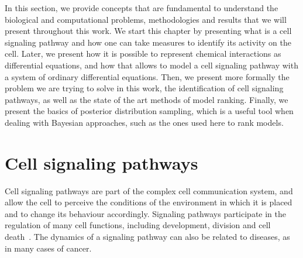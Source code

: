 
In this section, we provide concepts that are fundamental to 
understand the biological and computational problems, methodologies and
results that we will present throughout this work. We start this chapter 
by presenting what is a cell signaling pathway and how one can take 
measures to identify its activity on the cell. Later, we present how 
it is possible to represent chemical interactions as differential 
equations, and how that allows to model a cell signaling pathway
with a system of ordinary differential equations. Then, we present 
more formally the problem we are trying to solve in this work, the
identification of cell signaling pathways, as well as the state of the
art methods of model ranking. Finally, we present the basics of 
posterior distribution sampling, which is a useful tool when dealing 
with Bayesian approaches, such as the ones used here to rank models.

\section{Cell signaling pathways}
Cell signaling pathways are part of the complex cell communication 
system, and allow the cell to perceive the conditions of the 
environment in which it is placed and to change its behaviour
accordingly. Signaling pathways participate in the regulation of many
cell functions, including development, division and cell
death~\cite{Hancock2017}. The dynamics of a signaling pathway can also
be related to diseases, as in many cases of cancer.

